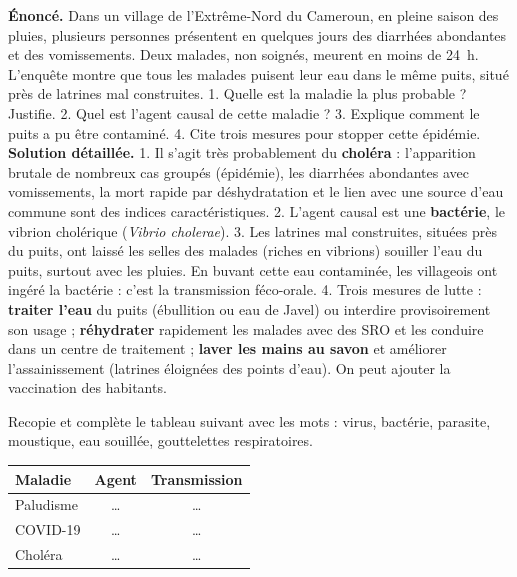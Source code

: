 \documentclass[11pt]{article}
\begin{document}
\begin{exoresolu}
\textbf{Énoncé.} Dans un village de l'Extrême-Nord du Cameroun, en pleine saison des pluies, plusieurs personnes présentent en quelques jours des diarrhées abondantes et des vomissements. Deux malades, non soignés, meurent en moins de \SI{24}{h}. L'enquête montre que tous les malades puisent leur eau dans le même puits, situé près de latrines mal construites.
1. Quelle est la maladie la plus probable ? Justifie.
2. Quel est l'agent causal de cette maladie ?
3. Explique comment le puits a pu être contaminé.
4. Cite trois mesures pour stopper cette épidémie.
\tcblower
\textbf{Solution détaillée.}
1. Il s'agit très probablement du \textbf{choléra} : l'apparition brutale de nombreux cas groupés (épidémie), les diarrhées abondantes avec vomissements, la mort rapide par déshydratation et le lien avec une source d'eau commune sont des indices caractéristiques.
2. L'agent causal est une \textbf{bactérie}, le vibrion cholérique (\emph{Vibrio cholerae}).
3. Les latrines mal construites, situées près du puits, ont laissé les selles des malades (riches en vibrions) souiller l'eau du puits, surtout avec les pluies. En buvant cette eau contaminée, les villageois ont ingéré la bactérie : c'est la transmission féco-orale.
4. Trois mesures de lutte : \textbf{traiter l'eau} du puits (ébullition ou eau de Javel) ou interdire provisoirement son usage ; \textbf{réhydrater} rapidement les malades avec des SRO et les conduire dans un centre de traitement ; \textbf{laver les mains au savon} et améliorer l'assainissement (latrines éloignées des points d'eau). On peut ajouter la vaccination des habitants.
\end{exoresolu}

\begin{exercice}
Recopie et complète le tableau suivant avec les mots : virus, bactérie, parasite, moustique, eau souillée, gouttelettes respiratoires.
\begin{center}
\begin{tabular}{|l|c|c|}
\hline
\rowcolor{popgreenL} \textbf{Maladie} & \textbf{Agent} & \textbf{Transmission} \\
\hline
Paludisme & \ldots & \ldots \\
\hline
COVID-19 & \ldots & \ldots \\
\hline
Choléra & \ldots & \ldots \\
\hline
\end{tabular}
\end{center}
\end{exercice}
\end{document}
